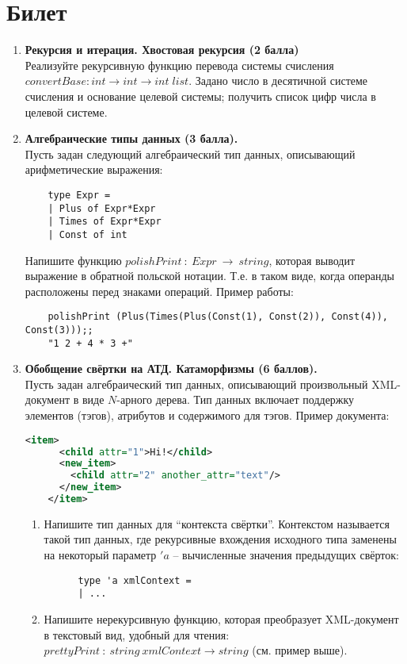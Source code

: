 \documentclass[a4paper,11pt]{article}
\newcommand{\<}{\langle}
\renewcommand{\>}{\rangle}
\begin{document}
\section*{Билет }
\begin{enumerate}
\item \textbf{Рекурсия и итерация. Хвостовая рекурсия (2 балла)}\\
  Реализуйте рекурсивную функцию перевода системы счисления 
  $convertBase: int \to int \to int\;list$. Задано число в десятичной системе
  счисления и основание целевой системы; получить список цифр числа в целевой
  системе.

\item \textbf{Алгебраические типы данных (3 балла).}\\
  Пусть задан следующий алгебраический тип данных, описывающий
  арифметические выражения:
  \begin{lstlisting}
    type Expr = 
    | Plus of Expr*Expr
    | Times of Expr*Expr
    | Const of int
  \end{lstlisting}
  Напишите функцию $polishPrint~:~Expr~\rightarrow~string$, которая выводит
  выражение в обратной польской нотации. Т.е. в таком виде, когда операнды
  расположены перед знаками операций. Пример работы:
  \begin{lstlisting}
    polishPrint (Plus(Times(Plus(Const(1), Const(2)), Const(4)), Const(3)));;
    "1 2 + 4 * 3 +"
  \end{lstlisting}

\item \textbf{Обобщение свёртки на АТД. Катаморфизмы (6 баллов).}\\
  Пусть задан алгебраический тип данных, описывающий произвольный 
  XML-документ в виде $N$-арного дерева. Тип данных включает поддержку 
  элементов (тэгов), атрибутов и содержимого для тэгов. Пример документа:
  \begin{lstlisting}[language=XML]
    <item>
      <child attr="1">Hi!</child>
      <new_item>
        <child attr="2" another_attr="text"/>
      </new_item>
    </item>
  \end{lstlisting}
  \begin{enumerate}
  \item Напишите тип данных для ``контекста свёртки''. Контекстом называется
    такой тип данных, где рекурсивные вхождения исходного типа заменены на
    некоторый параметр $'\!a$ -- вычисленные значения предыдущих свёрток:
    \begin{lstlisting}
      type 'a xmlContext =
      | ...
    \end{lstlisting}
  \item Напишите нерекурсивную функцию, которая преобразует XML-документ
    в текстовый вид, удобный для чтения: $prettyPrint~:~string~xmlContext 
    \rightarrow string$
    (см. пример выше).
  \end{enumerate}
\end{enumerate}
\end{document}
